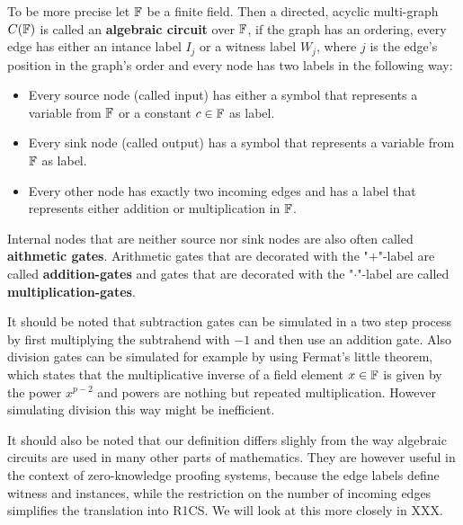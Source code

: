 To be more precise let $\mathbb{F}$ be a finite field. Then a directed, acyclic multi-graph $C(\mathbb{F})$ is called an \textbf{algebraic circuit} over $\mathbb{F}$, if the graph has an ordering, every edge has either an intance label $I_j$ or a witness label $W_j$, where $j$ is the edge's position in the graph's order and every node has two labels in the following way:
\begin{itemize}
\item Every source node (called input) has either a symbol that represents a variable from $\mathbb{F}$ or a constant $c\in\mathbb{F}$ as label.
\item Every sink node (called output) has a symbol that represents a variable from $\mathbb{F}$ as label.
\item Every other node has exactly two incoming edges and has a label that represents either addition or multiplication in $\mathbb{F}$.
\end{itemize}
Internal nodes that are neither source nor sink nodes are also often called \textbf{aithmetic gates}. Arithmetic gates that are decorated with the "$+$"-label are called \textbf{addition-gates} and gates that are decorated with the "$\cdot$"-label are called \textbf{multiplication-gates}.

It should be noted that subtraction gates can be simulated in a two step process by first multiplying the subtrahend with $-1$ and then use an addition gate. Also division gates can be simulated for example by using Fermat's little theorem, which states that the multiplicative inverse of a field element $x\in\mathbb{F}$ is given by the power $x^{p-2}$ and powers are nothing but repeated multiplication. However simulating division this way might be inefficient.

It should also be noted that our definition differs slighly from the way algebraic circuits are used in many other parts of mathematics. They are however useful in the context of zero-knowledge proofing systems, because the edge labels define witness and instances, while the restriction on the number of incoming edges simplifies the translation into R1CS. We will look at this more closely in XXX.

